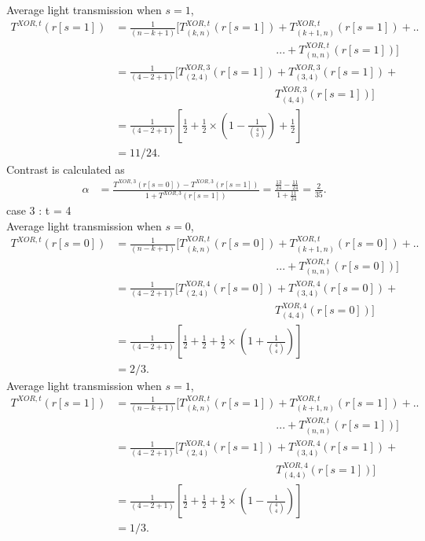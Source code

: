 Average light transmission when $s=1$,
\begin{align*}
T^{XOR,t}(r[s=1]) &= \frac{1}{(n-k+1)} [T^{XOR,t}_{(k,n)} (r[s=1]) + T^{XOR,t}_{(k+1,n)} (r[s=1]) + ..\\&\phantom{{}=\frac{1}{(n-k+1)} [T^{XOR,t}_{(k,n)} (r[s=1])}... + T^{XOR,t}_{(n,n)} (r[s=1])]\\
&=\frac{1}{(4-2+1)} [T^{XOR,3}_{(2,4)} (r[s=1]) + T^{XOR,3}_{(3,4)} (r[s=1]) + \\&\phantom{{}=\frac{1}{(4-2+1)} [T^{XOR,3}_{(2,4)} (r[s=1])} T^{XOR,3}_{(4,4)} (r[s=1])]\\
&=\frac{1}{(4-2+1)} [\frac {1}{2}+\frac {1}{2} \times (1 - \frac {1}{\binom 43}) +\frac {1}{2}]\\
&= 11/24.
\end{align*}
Contrast is calculated as  
\begin{align*}
\alpha &= \frac{T^{XOR,3}(r[s=0]) - T^{XOR,3}(r[s=1])}{1 +T^{XOR,3}(r[s=1])}=\frac{\frac{13}{24}-\frac{11}{24}}{1+\frac{11}{24}}= \frac{2}{35}.
\end{align*}
case 3 : t = 4\\
Average light transmission when $s=0$,
\begin{align*}
T^{XOR,t}(r[s=0]) &= \frac{1}{(n-k+1)} [T^{XOR,t}_{(k,n)} (r[s=0]) + T^{XOR,t}_{(k+1,n)} (r[s=0]) + ..\\&\phantom{{}=\frac{1}{(n-k+1)} [T^{XOR,t}_{(k,n)} (r[s=0])}... + T^{XOR,t}_{(n,n)} (r[s=0])]\\
&=\frac{1}{(4-2+1)} [T^{XOR,4}_{(2,4)} (r[s=0]) + T^{XOR,4}_{(3,4)} (r[s=0]) +\\&\phantom{{}=\frac{1}{(4-2+1)} [T^{XOR,4}_{(2,4)} (r[s=0])} T^{XOR,4}_{(4,4)} (r[s=0])]\\
&=\frac{1}{(4-2+1)} [\frac {1}{2}+ \frac {1}{2} + \frac {1}{2} \times (1 + \frac {1}{\binom 44})]\\
&= 2/3.
\end{align*}
Average light transmission when $s=1$,
\begin{align*}
T^{XOR,t}(r[s=1]) &= \frac{1}{(n-k+1)} [T^{XOR,t}_{(k,n)} (r[s=1]) + T^{XOR,t}_{(k+1,n)} (r[s=1]) + ..\\&\phantom{{}=\frac{1}{(n-k+1)} [T^{XOR,t}_{(k,n)} (r[s=1])}... + T^{XOR,t}_{(n,n)} (r[s=1])]\\
&=\frac{1}{(4-2+1)} [T^{XOR,4}_{(2,4)} (r[s=1]) + T^{XOR,4}_{(3,4)} (r[s=1]) + \\&\phantom{{}=\frac{1}{(n-k+1)} [T^{XOR,t}_{(k,n)} (r[s=1])} T^{XOR,4}_{(4,4)} (r[s=1])]\\
&=\frac{1}{(4-2+1)} [\frac {1}{2}+ \frac {1}{2} + \frac {1}{2} \times (1 - \frac {1}{\binom 44})]\\
&= 1/3.
\end{align*}
